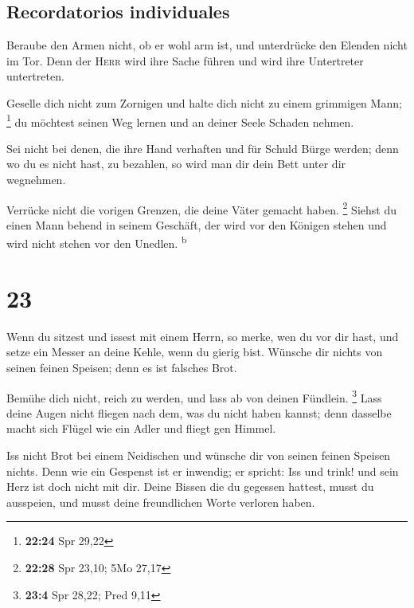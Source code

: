 \hypertarget{recordatorios-individuales}{%
\subsection{Recordatorios
individuales}\label{recordatorios-individuales}}

 Beraube den Armen nicht, ob er wohl arm ist, und
unterdrücke den Elenden nicht im Tor.  Denn der
\textsc{Herr} wird ihre Sache führen und wird ihre Untertreter
untertreten.

 Geselle dich nicht zum Zornigen und halte dich nicht zu
einem grimmigen Mann; \footnote{\textbf{22:24} Spr 29,22}
 du möchtest seinen Weg lernen und an deiner Seele
Schaden nehmen.

 Sei nicht bei denen, die ihre Hand verhaften und für
Schuld Bürge werden;  denn wo du es nicht hast, zu
bezahlen, so wird man dir dein Bett unter dir wegnehmen.

 Verrücke nicht die vorigen Grenzen, die deine Väter
gemacht haben. \footnote{\textbf{22:28} Spr 23,10; 5Mo 27,17}
 Siehst du einen Mann behend in seinem Geschäft, der wird
vor den Königen stehen und wird nicht stehen vor den Unedlen.
\textsuperscript{b}

\hypertarget{section-22}{%
\section{23}\label{section-22}}

 Wenn du sitzest und issest mit einem Herrn, so merke, wen
du vor dir hast,  und setze ein Messer an deine Kehle,
wenn du gierig bist.  Wünsche dir nichts von seinen feinen
Speisen; denn es ist falsches Brot.

 Bemühe dich nicht, reich zu werden, und lass ab von
deinen Fündlein. \footnote{\textbf{23:4} Spr 28,22; Pred 9,11}
 Lass deine Augen nicht fliegen nach dem, was du nicht
haben kannst; denn dasselbe macht sich Flügel wie ein Adler und fliegt
gen Himmel.

 Iss nicht Brot bei einem Neidischen und wünsche dir von
seinen feinen Speisen nichts.  Denn wie ein Gespenst ist
er inwendig; er spricht: Iss und trink! und sein Herz ist doch nicht mit
dir.  Deine Bissen die du gegessen hattest, musst du
ausspeien, und musst deine freundlichen Worte verloren haben.

